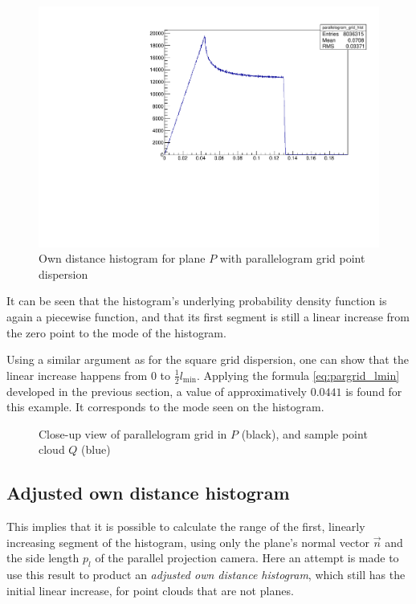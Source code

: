 \begin{figure}[H]
\centering
\includegraphics[width=.5\textwidth]{fig/parallelogram_grid.pdf}
\caption{Own distance histogram for plane $P$ with parallelogram grid point dispersion}
\label{fig:plane_par_cphist}
\end{figure}

It can be seen that the histogram's underlying probability density function is again a piecewise function, and that its first segment is still a linear increase from the zero point to the mode of the histogram.

Using a similar argument as for the square grid dispersion, one can show that the linear increase happens from $0$ to $\frac{1}{2} l_\text{min}$. Applying the formula \ref{eq:pargrid_lmin} developed in the previous section, a value of approximatively $0.0441$ is found for this example. It corresponds to the mode seen on the histogram.

\begin{figure}[p]
\centering
{
	\setlength{\fboxsep}{0pt}%
	\setlength{\fboxrule}{0.5pt}%
}
\caption{Close-up view of parallelogram grid in $P$ (black), and sample point cloud $Q$ (blue)}
\label{fig:par_grid}
\end{figure}


\subsection{Adjusted own distance histogram}
This implies that it is possible to calculate the range of the first, linearly increasing segment of the histogram, using only the plane's normal vector $\vec{n}$ and the side length $p_l$ of the parallel projection camera. Here an attempt is made to use this result to product an \emph{adjusted own distance histogram}, which still has the initial linear increase, for point clouds that are not planes.

